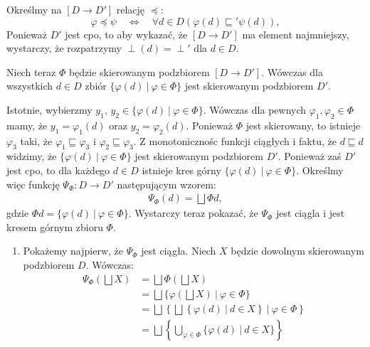 \begin{dowod}
      Określmy na \([D\to D']\) relację  \(\preceq\):
\[
\varphi \preceq \psi\quad \Leftrightarrow\quad \forall d\in D \left(\varphi(d) \sqsubseteq' \psi(d)\right),
\]
Ponieważ \(D'\) jest cpo, to aby wykazać, że \([D\to D']\) ma element najmniejszy, wystarczy, że rozpatrzymy \(\perp(d)=\perp'\) dla \(d\in D\).

Niech teraz \(\Phi\) będzie skierowanym podzbiorem \([D\to D']\). 
Wówczas  dla  wszystkich  \(d\in D\)  zbiór  \(\{\varphi(d)\  |\ 
      \varphi\in\Phi\}\) jest  skierowanym podzbiorem  \(D'\). 

      Istotnie, wybierzmy \(y_1,\,y_2\in\{\varphi(d)\ |\ \varphi\in\Phi\}\). Wówczas dla pewnych \(\varphi_1, \varphi_2\in\Phi\) mamy, że \(y_1=\varphi_1(d)\) oraz \(y_2=\varphi_2(d)\). Ponieważ \(\Phi\) jest skierowany, to istnieje \(\varphi_3\) taki, że \(\varphi_1\sqsubseteq \varphi_3\) i \(\varphi_2\sqsubseteq \varphi_3\). Z monotonicznośc funkcji ciągłych i faktu, że \(d\sqsubseteq d\) widzimy, że \(\{\varphi(d)\  |\ \varphi\in\Phi\}\) jest skierowanym podzbiorem \(D'\). Ponieważ zaś \(D'\) jest cpo, to dla każdego \(d\in D\) istnieje kres górny  \(\{\varphi(d)\  |\ \varphi\in\Phi\}\). Określmy więc funkcję \(\Psi_\Phi: D\to D'\) następującym wzorem:
      \begin{align*}
        \Psi_\Phi(d) = \bigsqcup \Phi d,
      \end{align*}
      gdzie \(\Phi d=\{\varphi(d)\ |\ \varphi \in \Phi\}\). Wystarczy teraz pokazać, że \(\Psi_\Phi\) jest ciągla i jest kresem górnym zbioru \(\Phi\).
      \begin{enumerate}
        \item Pokażemy najpierw, że \(\Psi_\Phi\) jest ciągła. Niech \(X\) będzie dowolnym skierowanym podzbiorem \(D\). Wówczas:
          \begin{align*}
  \Psi_\Phi(\bigsqcup X)&= \bigsqcup \Phi (\bigsqcup X)\\
                        &= \bigsqcup \{\varphi(\bigsqcup X)\ |\ \varphi\in\Phi\}\\
                        &= \bigsqcup \left\{\bigsqcup\left\{\varphi(d)\ |\ d\in X\right\}\ |\ \varphi\in \Phi\right\}\\
                        &= \bigsqcup \left\{\bigcup\limits_{\varphi\in\Phi}\{\varphi(d)\ |\ d\in X\}\right\}\\

\end{align*}
\end{enumerate}
\end{dowod}
